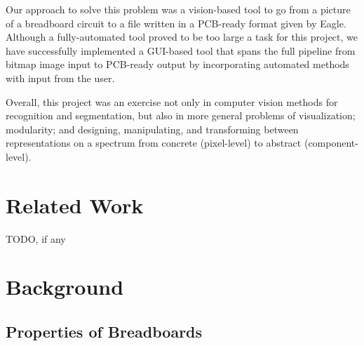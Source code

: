 \documentclass[10pt,twocolumn,letterpaper]{article}
\begin{document}
Our approach to solve this problem was a vision-based tool to
go from a picture of a breadboard circuit to a file written in a
PCB-ready format given by Eagle. Although a fully-automated tool
proved to be too large a task for this project, we have successfully
implemented a GUI-based tool that spans the full pipeline from
bitmap image input to PCB-ready output by incorporating automated
methods with input from the user.

Overall, this project was an exercise not only in computer vision
methods for recognition and segmentation, but also in more general
problems of visualization; modularity; and designing, manipulating,
and transforming between representations on a spectrum from
concrete (pixel-level) to abstract (component-level).


\section{Related Work}

TODO, if any


\section{Background}

\subsection{Properties of Breadboards}
\end{document}
